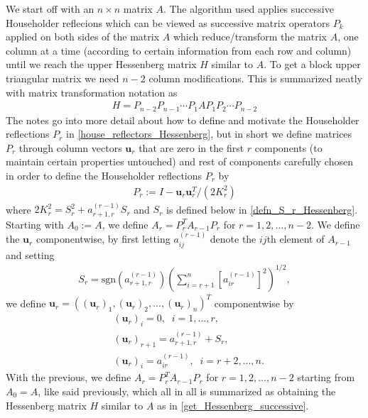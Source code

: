 \documentclass[11.5pt]{article}
\theoremstyle{definition}
\begin{document}
We start off with an $n\times n$ matrix $A$. The algorithm used applies successive Householder reflecions which can be viewed as successive matrix operators $P_k$ applied on both sides of the matrix $A$ which reduce/transform the matrix $A$, one column at a time (according to certain information from each row and column) until we reach the upper Hessenberg matrix $H$ similar to $A$. To get a block upper triangular matrix we need $n-2$ column modifications. This is summarized neatly with matrix transformation notation as
\begin{align}\label{get_Hessenberg_successive}
H=P_{n-2}P_{n-1}\cdots P_{1}A P_{1}P_2\cdots P_{n-2}
\end{align} 
The notes go into more detail about how to define and motivate the Householder reflections $P_r$ in \eqref{house_reflectors_Hessenberg}, but in short we define matrices $P_r$ through column vectors $\mathbf{u}_r$ that are zero in the first $r$ components (to maintain certain properties untouched) and rest of components carefully chosen in order to define the Householder reflections $P_r$ by
\begin{align}\label{house_reflectors_Hessenberg}
P_r:=  I- \mathbf{u}_r \mathbf{u}_r^T/(2K_r^2)
\end{align}
where $2K_r^2=S_r^2+a_{r+1,r}^{(r-1)} S_r$ and $S_r$ is defined below in \eqref{defn_S_r_Hessenberg}.
Starting with $A_0:=A$, we define $A_r=P_r^T A_{r-1} P_r$ for $r=1,2,...,n-2$. We define the $\mathbf{u}_r$ componentwise, by first letting $a_{ij}^{(r-1)}$ denote the $ij$th element of $A_{r-1}$ and setting
\begin{align}\label{defn_S_r_Hessenberg}
S_r=\text{sgn}\left(a_{r+1,r}^{(r-1)} \right)\left(\sum_{i=r+1}^n [a_{ir}^{(r-1)}]^2\right)^{1/2},
\end{align}
we define $\mathbf{u}_r= ((\mathbf{u}_r)_1, (\mathbf{u}_r)_2,...,(\mathbf{u}_r)_n)^T$ componentwise by
\begin{align*}
&(\mathbf{u}_r)_i=0, \;\; i=1,...,r,\\
&(\mathbf{u}_r)_{r+1}=a_{r+1,r}^{(r-1)}+S_r, \\
&(\mathbf{u}_r)_i=a_{ir}^{(r-1)}, \;\; i=r+2,...,n.
\end{align*}
With the previous, we define $A_r=P_r^T A_{r-1} P_r$ for $r=1,2,...,n-2$ starting from $A_0=A$, like said previously, which all in all is summarized as obtaining the Hessenberg matrix $H$ similar to $A$ as in \eqref{get_Hessenberg_successive}.\\
\end{document}

